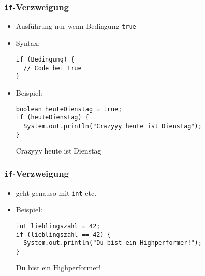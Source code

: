 \documentclass{../../presentation}
\begin{document}
\begin{frame}[fragile]
\begin{columns}
    \begin{column}{0.4\textwidth}
    \end{column}
  \end{columns}
\end{frame}





\begin{frame}[fragile]
  \frametitle{\texttt{if}-Verzweigung}

  \begin{itemize}
    \item<1-> Ausführung nur wenn Bedingung \texttt{true}
    \item<1-> Syntax:
          \begin{verbatim}
if (Bedingung) {
  // Code bei true
}
      \end{verbatim}
    \item<2-> Beispiel:
          \begin{verbatim}
boolean heuteDienstag = true;
if (heuteDienstag) {
  System.out.println("Crazyyy heute ist Dienstag");
}
      \end{verbatim}
          \begin{ausgabe}
            Crazyyy heute ist Dienstag
          \end{ausgabe}
  \end{itemize}
\end{frame}

\begin{frame}[fragile]
  \frametitle{\texttt{if}-Verzweigung}

  \begin{itemize}
    \item<1-> geht genauso mit \texttt{int} etc.
    \item<2-> Beispiel:
          \begin{verbatim}
int lieblingszahl = 42;
if (lieblingszahl == 42) {
  System.out.println("Du bist ein Highperformer!");
}
      \end{verbatim}
          \begin{ausgabe}
            Du bist ein Highperformer!
          \end{ausgabe}
  \end{itemize}
\end{frame}
\end{document}
